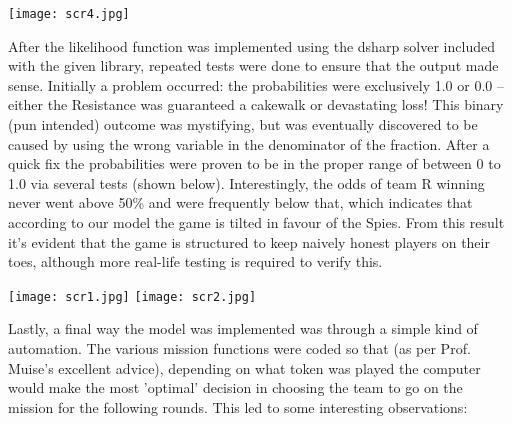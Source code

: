 \documentclass[pdftex,10pt,a4paper]{article}
\numberwithin{equation}{section} %
\begin{document}
\texttt{[image: scr4.jpg]}\newline \newline \newline \newline 


After the likelihood function was implemented using the dsharp solver included with the given library, repeated tests were done to ensure that the output made sense. Initially a problem occurred: the probabilities were exclusively 1.0 or 0.0 – either the Resistance was guaranteed a cakewalk or devastating loss! This binary (pun intended) outcome was mystifying, but was eventually discovered to be caused by using the wrong variable in the denominator of the fraction. After a quick fix the probabilities were proven to be in the proper range of between 0 to 1.0 via several tests (shown below). Interestingly, the odds of team R winning never went above 50\% and were frequently below that, which indicates that according to our model the game is tilted in favour of the Spies. From this result it’s evident that the game is structured to keep naively honest players on their toes, although more real-life testing is required to verify this.\newline

\texttt{[image: scr1.jpg]}\newline
\texttt{[image: scr2.jpg]}\newline

Lastly, a final way the model was implemented was through a simple kind of automation. The various mission functions were coded so that (as per Prof. Muise's excellent advice), depending on what token was played the computer would make the most 'optimal' decision in choosing the team to go on the mission for the following rounds. This led to some interesting observations:\newline
\end{document}

